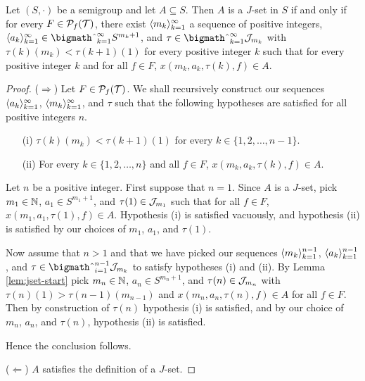 \begin{lem}
  \label{lem:many}
  Let $(S, \cdot)$ be a semigroup and let $A \subseteq S$.
  Then $A$ is a $J$-set in $S$ if and only if for every $F \in \mathcal{P}_f(\mathcal{T})$, there exist $\langle m_k \rangle_{k=1}^\infty$ a sequence of positive integers, $\la a_k \ra_{k=1}^\infty \in \bigtimes_{k=1}^\infty S^{m_k+1}$, and $\tau \in \bigtimes_{k=1}^\infty \calJ_{m_k}$ with $\tau(k)(m_k) < \tau(k+1)(1)$ for every positive integer $k$ such that for every positive integer $k$ and for all $f \in F$, $x(m_k, a_k, \tau(k), f) \in A$.
\end{lem}
\begin{proof}
  ($\Rightarrow$)
  Let $F \in \mathcal{P}_f(\mathcal{T})$.
  We shall recursively construct our sequences $\langle a_k \rangle_{k=1}^\infty$, $\langle m_k \rangle_{k=1}^\infty$, and $\tau$ such that the following hypotheses are satisfied for all positive integers $n$. 
  \begin{itemize}
    \item[(i)]
      $\tau(k)(m_k) < \tau(k+1)(1)$ for every $k \in \{1, 2, \ldots, n-1\}$.

    \item[(ii)]
      For every $k \in \{1, 2, \ldots, n\}$ and all $f \in F$, $x(m_k, a_k, \tau(k), f) \in A$.
  \end{itemize}
  
  Let $n$ be a positive integer.
  First suppose that $n = 1$. 
  Since $A$ is a $J$-set, pick $m_1 \in \mathbb{N}$, $a_1 \in S^{m_1+1}$, and $\tau(1) \in \mathcal{J}_{m_1}$ such that for all $f \in F$, $x(m_1, a_1, \tau(1), f) \in A$. 
  Hypothesis (i) is satisfied vacuously, and hypothesis (ii) is satisfied by our choices of $m_1$, $a_1$, and $\tau(1)$. 

  Now assume that $n > 1$ and that we have picked our sequences $\langle m_k \rangle_{k=1}^{n-1}$, $\langle a_k \rangle_{k=1}^{n-1}$, and $\tau \in \bigtimes_{i=1}^{n-1} \calJ_{m_k}$ to satisfy hypotheses (i) and (ii). 
  By Lemma \ref{lem:jset-start} pick $m_n \in \mathbb{N}$, $a_n \in S^{m_n+1}$, and $\tau(n) \in \mathcal{J}_{m_n}$ with $\tau(n)(1) > \tau(n-1)(m_{n-1})$ and $x(m_n, a_n, \tau(n), f) \in A$ for all $f \in F$. 
  Then by construction of $\tau(n)$ hypothesis (i) is satisfied, and by our choice of $m_n$, $a_n$, and $\tau(n)$, hypothesis (ii) is satisfied. 

  Hence the conclusion follows. 

  ($\Leftarrow$)
  $A$ satisfies the definition of a $J$-set.
\end{proof}

